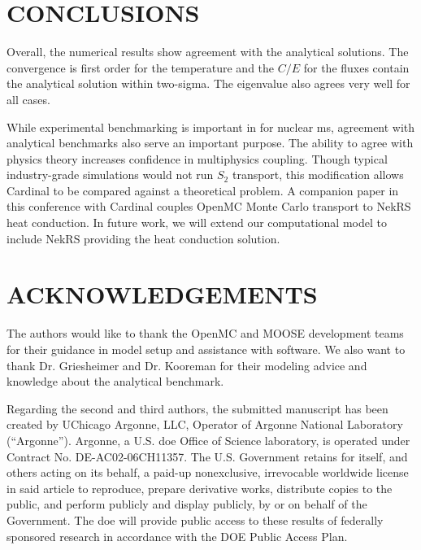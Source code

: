 \documentclass[letterpaper]{mc2023}
\begin{document}
\section{CONCLUSIONS}\label{sec:conclusions}
Overall, the numerical results show agreement with the analytical solutions. The convergence is first order for the temperature and the $C/E$ for the fluxes
contain the analytical solution within two-sigma. The eigenvalue also agrees very well for all cases.

While experimental benchmarking is important in for nuclear \gls{ms}, agreement with analytical benchmarks also serve an important purpose. The ability
to agree with physics theory increases confidence in multiphysics coupling. Though typical industry-grade simulations would not run $S_{2}$ transport,
this modification allows Cardinal to be compared against a theoretical problem. A companion paper in this conference with Cardinal \cite{aya2023} couples
OpenMC Monte Carlo transport to NekRS heat conduction. In future work, we will extend our computational model to include NekRS providing the heat
conduction solution.

\section*{ACKNOWLEDGEMENTS}
The authors would like to thank the OpenMC and MOOSE development teams for their guidance in model setup and assistance
with software. We also want to thank Dr. Griesheimer and Dr. Kooreman for their modeling advice and knowledge about the
analytical benchmark.

Regarding the second and third authors, the submitted manuscript has been created by UChicago Argonne, LLC, Operator of Argonne National Laboratory (“Argonne”).
Argonne, a U.S. \gls{doe} Office of Science laboratory, is operated under Contract No. DE-AC02-06CH11357. The U.S. Government retains for itself, and others
acting on its behalf, a paid-up nonexclusive, irrevocable worldwide license in said article to reproduce, prepare derivative works, distribute copies to the
public, and perform publicly and display publicly, by or on behalf of the Government. The \gls{doe} will provide public access to these results of federally
sponsored research in accordance with the DOE Public Access Plan.

\setlength{\baselineskip}{12pt}


\setlength{\baselineskip}{12pt}
\end{document}
